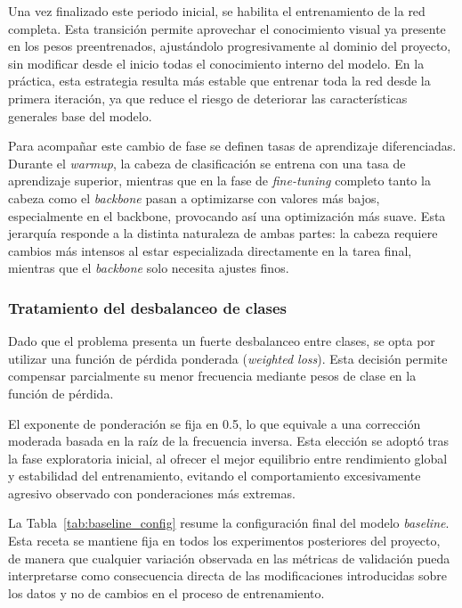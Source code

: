 ﻿\documentclass[10pt,a4paper,twocolumn,twoside]{article}
\begin{document}
Una vez finalizado este periodo inicial, se habilita el entrenamiento de la red completa. Esta transición permite aprovechar el conocimiento visual ya presente en los pesos preentrenados, ajustándolo progresivamente al dominio del proyecto, sin modificar desde el inicio todas el conocimiento interno del modelo. En la práctica, esta estrategia resulta más estable que entrenar toda la red desde la primera iteración, ya que reduce el riesgo de deteriorar las características generales base del modelo.

Para acompañar este cambio de fase se definen tasas de aprendizaje diferenciadas. Durante el \textit{warmup}, la cabeza de clasificación se entrena con una tasa de aprendizaje superior, mientras que en la fase de \textit{fine-tuning} completo tanto la cabeza como el \textit{backbone} pasan a optimizarse con valores más bajos, especialmente en el backbone, provocando así una optimización más suave. Esta jerarquía responde a la distinta naturaleza de ambas partes: la cabeza requiere cambios más intensos al estar especializada directamente en la tarea final, mientras que el \textit{backbone} solo necesita ajustes finos.

\subsubsection{Tratamiento del desbalanceo de clases}
Dado que el problema presenta un fuerte desbalanceo entre clases, se opta por utilizar una función de pérdida ponderada (\textit{weighted loss}). Esta decisión permite compensar parcialmente su menor frecuencia mediante pesos de clase en la función de pérdida.

El exponente de ponderación se fija en 0.5, lo que equivale a una corrección moderada basada en la raíz de la frecuencia inversa. Esta elección se adoptó tras la fase exploratoria inicial, al ofrecer el mejor equilibrio entre rendimiento global y estabilidad del entrenamiento, evitando el comportamiento excesivamente agresivo observado con ponderaciones más extremas.

La Tabla~\ref{tab:baseline_config} resume la configuración final del modelo \textit{baseline}. Esta receta se mantiene fija en todos los experimentos posteriores del proyecto, de manera que cualquier variación observada en las métricas de validación pueda interpretarse como consecuencia directa de las modificaciones introducidas sobre los datos y no de cambios en el proceso de entrenamiento.
\end{document}
